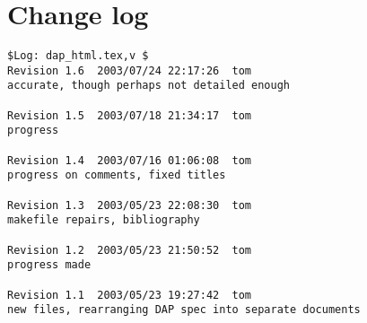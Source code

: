 \documentclass[justify]{dods-paper}
\begin{document}
\section{Change log}

\begin{verbatim}
$Log: dap_html.tex,v $
Revision 1.6  2003/07/24 22:17:26  tom
accurate, though perhaps not detailed enough

Revision 1.5  2003/07/18 21:34:17  tom
progress

Revision 1.4  2003/07/16 01:06:08  tom
progress on comments, fixed titles

Revision 1.3  2003/05/23 22:08:30  tom
makefile repairs, bibliography

Revision 1.2  2003/05/23 21:50:52  tom
progress made

Revision 1.1  2003/05/23 19:27:42  tom
new files, rearranging DAP spec into separate documents


\end{verbatim}
\end{document}
